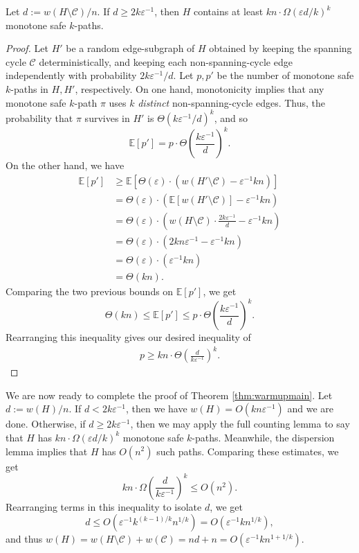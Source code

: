 \documentclass{theoretics}
\newcommand{\eps}{\varepsilon}
\newcommand{\cee}{\mathcal{C}}
\begin{document}
\begin{lemma}  \label{lem:warmupfc}
Let $d := w(H \setminus \cee) / n$.
If $d \ge 2k \eps^{-1}$, then $H$ contains at least $kn \cdot \Omega(\eps d/k)^k$ monotone safe $k$-paths.
\end{lemma}
\begin{proof}
Let $H'$ be a random edge-subgraph of $H$ obtained by keeping the spanning cycle $\cee$ deterministically, and keeping each non-spanning-cycle edge independently with probability $2k\eps^{-1} / d$.
Let $p, p'$ be the number of monotone safe $k$-paths in $H, H'$, respectively.
On one hand, monotonicity implies that any monotone safe $k$-path $\pi$ uses $k$ \emph{distinct} non-spanning-cycle edges.
Thus, the probability that $\pi$ survives in $H'$ is $\Theta(k\eps^{-1} / d)^{k}$, and so
$$\mathbb{E}[p'] = p \cdot \Theta\left(\frac{k\eps^{-1}}{d}\right)^{k}.$$
On the other hand, we have
\begin{align*}
\mathbb{E}[p'] &\ge \mathbb{E}\left[\Theta(\eps) \cdot \left( w(H' \setminus \cee) - \eps^{-1} kn \right)\right] \tag*{Medium Counting Lemma}\\
&= \Theta(\eps) \cdot \left(\mathbb{E}\left[ w(H' \setminus \cee)\right] - \eps^{-1} kn\right)\\
&= \Theta(\eps) \cdot \left( w(H \setminus \cee) \cdot \frac{2k \eps^{-1}}{d} - \eps^{-1} kn\right)\\
&= \Theta(\eps) \cdot \left( 2kn \eps^{-1} - \eps^{-1} kn\right)\\
&= \Theta(\eps) \cdot \left( \eps^{-1} kn\right)\\
&= \Theta(kn).
\end{align*}
Comparing the two previous bounds on $\mathbb{E}[p']$, we get
$$\Theta(kn) \le \mathbb{E}[p'] \le p \cdot \Theta\left(\frac{k \eps^{-1}}{d}\right)^{k}.$$
Rearranging this inequality gives our desired inequality of
\begin{align*}
p \ge kn \cdot \Theta\left( \frac{d}{k \eps^{-1}} \right)^k. \tag*{\qedhere}
\end{align*}
\end{proof}


We are now ready to complete the proof of Theorem \ref{thm:warmupmain}.
Let $d := w(H)/n$.
If $d < 2k \eps^{-1}$, then we have $w(H) = O(kn \eps^{-1})$ and we are done.
Otherwise, if $d \ge 2k \eps^{-1}$, then we may apply the full counting lemma to say that $H$ has $kn \cdot \Omega(\eps d/k)^k$ monotone safe $k$-paths.
Meanwhile, the dispersion lemma implies that $H$ has $O(n^2)$ such paths.
Comparing these estimates, we get
$$kn \cdot \Omega\left(\frac{d}{k\eps^{-1}}\right)^k \le O(n^2).$$
Rearranging terms in this inequality to isolate $d$, we get
$$d \le O\left(\eps^{-1} k^{(k-1)/k} n^{1/k}\right) = O\left(\eps^{-1} k n^{1/k} \right),$$
and thus $w(H) = w(H \setminus \cee) + w(\cee) = nd + n = O\left( \eps^{-1} k n^{1+1/k} \right)$.
\end{document}

